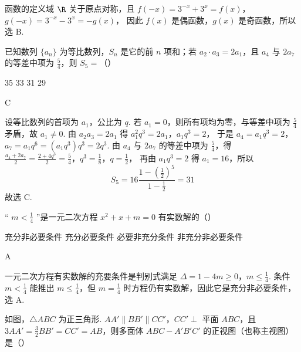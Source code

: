 \begin{solution}
函数的定义域 \(\R\) 关于原点对称，且
\(f(-x)=3^{-x}+3^x=f(x)\)，\(g(-x)=3^{-x}-3^x=-g(x)\)，
因此 \(f(x)\) 是偶函数，\(g(x)\) 是奇函数，所以选 B.
\end{solution}

\begin{problem}
已知数列 \(\{a_{n}\}\) 为等比数列，\(S_{n}\) 是它的前 \(n\) 项和；若 \(a_{2} \cdot a_{3} = 2a_{1}\)，且 \(a_{4}\) 与 \(2a_{7}\) 的等差中项为 \(\frac{5}{4}\)，则 \(S_{5} =\)（\quad）

\choices
    {35}
    {33}
    {31}
    {29}
\end{problem}

\begin{answer}
C
\end{answer}

\begin{solution}
设等比数列的首项为 \(a_1\)，公比为 \(q\). 若 \(a_1=0\)，则所有项均为零，与等差中项为 \(\frac54\) 矛盾，故 \(a_1\ne0\). 由 \(a_2a_3=2a_1\) 得
\(a_1^2q^3=2a_1\)，\(a_1q^3=2\)，
于是 \(a_4=a_1q^3=2\)，\(a_7=a_1q^6=(a_1q^3)q^3=2q^3\). 由 \(a_4\) 与 \(2a_7\) 的等差中项为 \(\frac54\)，得
\(\frac{a_4+2a_7}{2}=\frac{2+4q^3}{2}=\frac54\)，\(q^3=\frac18\)，\(q=\frac12\)，
再由 \(a_1q^3=2\) 得 \(a_1=16\)，所以
\[
S_5=16\frac{1-(\frac12)^5}{1-\frac12}=31
\]
故选 C.
\end{solution}

\begin{problem}
“ \( m < \frac{1}{4} \) ”是一元二次方程 \( x^{2} + x + m = 0 \) 有实数解的（\quad）

\choices
    {充分非必要条件}
    {充分必要条件}
    {必要非充分条件}
    {非充分非必要条件}
\end{problem}

\begin{answer}
A
\end{answer}

\begin{solution}
一元二次方程有实数解的充要条件是判别式满足
\(\Delta=1-4m\geqslant0\)，\(m\leqslant\frac14\).
条件 \(m<\frac14\) 能推出 \(m\leqslant\frac14\)，但 \(m=\frac14\) 时方程仍有实数解，因此它是充分非必要条件，选 A.
\end{solution}

\begin{problem}
如图，\(\triangle ABC\) 为正三角形. \(AA' \parallel BB' \parallel CC'\)，\(CC' \perp\) 平面 \(ABC\)，且 \(3AA' = \frac{3}{2} BB' = CC' = AB\)，则多面体 \(ABC - A'B'C'\) 的正视图（也称主视图）是（\quad）


    {}
    {}
    {}
\end{problem}

